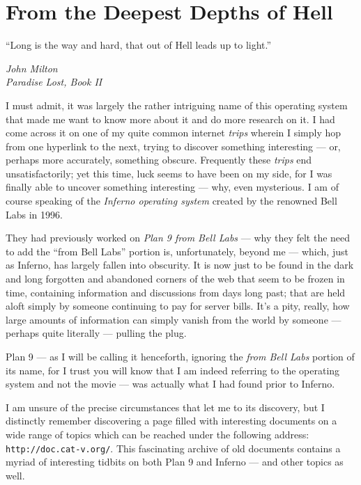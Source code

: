 \documentclass[a5paper,twoside,12pt]{report}
\begin{document}
\chapter*{From the Deepest Depths of Hell}

\epigraph{``Long is the way and hard, that out of Hell leads up to light.''}{\textit{John Milton\\Paradise Lost, Book II}}

I must admit, it was largely the rather intriguing name of this operating system that made me want to know more about it and do more research on it. I had come across it on one of my quite common internet \textit{trips} wherein I simply hop from one hyperlink to the next, trying to discover something interesting — or, perhaps more accurately, something obscure. 
Frequently these \textit{trips} end unsatisfactorily; yet this time, luck seems to have been on my side, for I was finally able to uncover something interesting — why, even mysterious. I am of course speaking of the \textit{Inferno operating system} created by the renowned Bell Labs in 1996. 

They had previously worked on \textit{Plan 9 from Bell Labs} — why they felt the need to add the ``from Bell Labs'' portion is, unfortunately, beyond me — which, just as Inferno, has largely fallen into obscurity. It is now just to be found in the dark and long forgotten and abandoned corners of the web that seem to be frozen in time, containing information and discussions from days long past; that are held aloft simply by someone continuing to pay for server bills. It's a pity, really, how large amounts of information can simply vanish from the world by someone — perhaps quite literally — pulling the plug.

Plan 9 — as I will be calling it henceforth, ignoring the \textit{from Bell Labs} portion of its name, for I trust you will know that I am indeed referring to the operating system and not the movie — was actually what I had found prior to Inferno.

I am unsure of the precise circumstances that let me to its discovery, but I distinctly remember discovering a page filled with interesting documents on a wide range of topics which can be reached under the following address: \texttt{http://doc.cat-v.org/}. 
This fascinating archive of old documents contains a myriad of interesting tidbits on both Plan 9 and Inferno — and other topics as well. 
\end{document}
